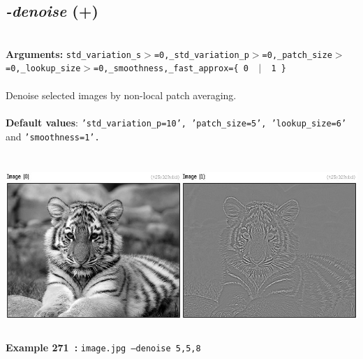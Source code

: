 \documentclass[a4paper,11pt,twoside]{book}
\begin{document}
\subsection{\emph{-denoise} (+)}\vspace*{-0.5em}
~\\\textbf{Arguments: } 
{\small \texttt{std\_variation\_s$>$=0,\_std\_variation\_p$>$=0,\_patch\_size$>$=0,\_lookup\_size$>$=0,\_smoothness,\_fast\_approx=\{ 0 ~$|$~ 1 \}}}\\~\\
Denoise selected images by non-local patch averaging.
~\\~\\\textbf{Default values}: {\small \texttt{'std\_variation\_p=10', 'patch\_size=5', 'lookup\_size=6'} and \texttt{'smoothness=1'.}}
\begin{center}\includegraphics[keepaspectratio=true,height=7cm,width=\textwidth]{img/gmic_def271.jpg}\\
{\footnotesize \textbf{Example 271~:} \texttt{image.jpg --denoise 5,5,8}}
\end{center}
\end{document}
